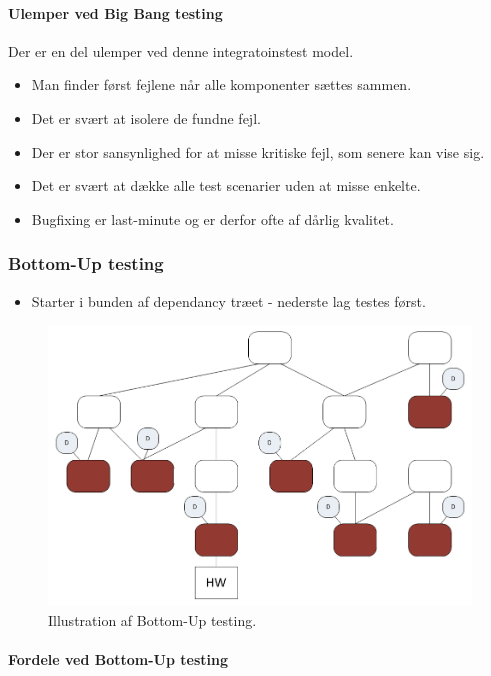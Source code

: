 \paragraph{Ulemper ved Big Bang testing}
Der er en del ulemper ved denne integratoinstest model.

\begin{itemize}
	\item Man finder først fejlene når alle komponenter sættes sammen.
	\item Det er svært at isolere de fundne fejl.
	\item Der er stor sansynlighed for at misse kritiske fejl, som senere kan vise sig.
	\item Det er svært at dække alle test scenarier uden at misse enkelte.
	\item Bugfixing er last-minute og er derfor ofte af dårlig kvalitet.
\end{itemize}


\subsubsection{Bottom-Up testing}

\begin{itemize}
	\item Starter i bunden af dependancy træet - nederste lag testes først.
\end{itemize}

\begin{figure}
\centering
\includegraphics[width=0.7\linewidth]{figs/bottomUp.PNG}
\caption{Illustration af Bottom-Up testing.}
\label{fig:bottomUp}
\end{figure}

\paragraph{Fordele ved Bottom-Up testing}

